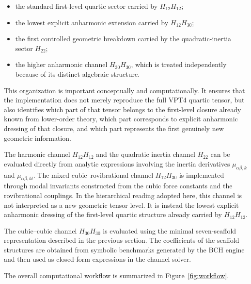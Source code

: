 \documentclass[aip,jcp,reprint]{revtex4-2}
\begin{document}
\begin{itemize}
\item the standard first-level quartic sector carried by
      $H_{12}H_{12}$;
\item the lowest explicit anharmonic extension carried by
      $H_{12}H_{30}$;
\item the first controlled geometric breakdown carried by the
      quadratic-inertia sector $H_{22}$;
\item the higher anharmonic channel $H_{30}H_{30}$, which is treated
      independently because of its distinct algebraic structure.
\end{itemize}

This organization is important conceptually and computationally. It
ensures that the implementation does not merely reproduce the full VPT4
quartic tensor, but also identifies which part of that tensor belongs to
the first-level closure already known from lower-order theory, which
part corresponds to explicit anharmonic dressing of that closure, and
which part represents the first genuinely new geometric information.

The harmonic channel $H_{12}H_{12}$ and the quadratic inertia channel
$H_{22}$ can be evaluated directly from analytic expressions involving
the inertia derivatives $\mu_{\alpha\beta,k}$ and
$\mu_{\alpha\beta,kl}$.
The mixed cubic--rovibrational channel $H_{12}H_{30}$ is implemented
through modal invariants constructed from the cubic force constants
and the rovibrational couplings.
In the hierarchical reading adopted here, this channel is not interpreted
as a new geometric tensor level. It is instead the lowest explicit
anharmonic dressing of the first-level quartic structure already carried
by $H_{12}H_{12}$.

The cubic--cubic channel $H_{30}H_{30}$ is evaluated using the minimal
seven-scaffold representation described in the previous section.
The coefficients of the scaffold structures are obtained from symbolic
benchmarks generated by the BCH engine and then used as closed-form
expressions in the channel solver.

The overall computational workflow is summarized in
Figure~\ref{fig:workflow}.
\end{document}
